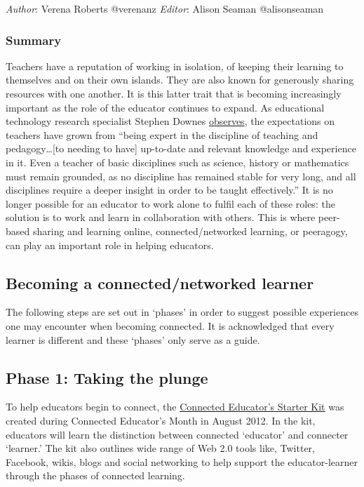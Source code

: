 \emph{Author}: Verena Roberts @verenanz \emph{Editor}: Alison Seaman
@alisonseaman

\subsubsection{Summary}

Teachers have a reputation of working in isolation, of keeping their
learning to themselves and on their own islands. They are also known for
generously sharing resources with one another. It is this latter trait
that is becoming increasingly important as the role of the educator
continues to expand. As educational technology research specialist
Stephen Downes
\href{http://www.huffingtonpost.com/stephen-downes/the-role-of-the-educator\_b\_790937.html}{observes},
the expectations on teachers have grown from ``being expert in the
discipline of teaching and pedagogy\ldots{}{[}to needing to have{]}
up-to-date and relevant knowledge and experience in it. Even a teacher
of basic disciplines such as science, history or mathematics must remain
grounded, as no discipline has remained stable for very long, and all
disciplines require a deeper insight in order to be taught
effectively.'' It is no longer possible for an educator to work alone to
fulfil each of these roles: the solution is to work and learn in
collaboration with others. This is where peer-based sharing and learning
online, connected/networked learning, or peeragogy, can play an
important role in helping educators.

\subsection{Becoming a connected/networked learner}

The following steps are set out in `phases' in order to suggest possible
experiences one may encounter when becoming connected. It is
acknowledged that every learner is different and these `phases' only
serve as a guide.

\subsection{Phase 1: Taking the plunge}

To help educators begin to connect, the
\href{http://www.google.com/url?q=https\%3A\%2F\%2Fdl.dropbox.com\%2Fu\%2F38904447\%2Fstarter-kit-final.pdf\&sa=D\&sntz=1\&usg=AFQjCNE9sNo1Lz9-zJ0KH48djXeYVoAF4A}{Connected
Educator's Starter Kit} was created during Connected Educator's Month in
August 2012. In the kit, educators will learn the distinction between
connected `educator' and connecter `learner.' The kit also outlines wide
range of Web 2.0 tools like, Twitter, Facebook, wikis, blogs and social
networking to help support the educator-learner through the phases of
connected learning.

